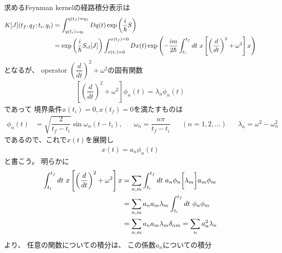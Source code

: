 求めるFeynman kernelの経路積分表示は
\begin{align}
    K[J]( t_f, q_f ; t_i, q_i )
    &=
    \int_{q(t_i) = q_i}^{q(t_f) = q_f}
        Dq(t)
    \exp\left(
        \dfrac{i}{\hbar} S
    \right)
\notag\\&=
    \exp\left(
        \dfrac{i}{\hbar} S_{cl} [J]
    \right)
    \int_{x(t_i) = 0}^{x(t_f) = 0}
        Dx(t)
    \exp\left(
        -
        \dfrac{ i m }{2\hbar}
        \int_{t_i}^{t_f} dt\ 
        x
        \left[
            \left(
                \dfrac{d}{dt}
            \right)^2
            +
            \omega^2
        \right]
        x
    \right)
\end{align}
となるが、
operator $
    \left(
        \dfrac{d}{dt}
    \right)^2
+
    \omega^2
$の固有関数
\begin{align}
    \left[
        \left(
            \dfrac{d}{dt}
        \right)^2
        +
        \omega^2
    \right]
    \phi_n(t)
    =
    \lambda_n
    \phi_n(t)
\end{align}
であって
境界条件$x(t_i) = 0, x(t_f) = 0$を満たすものは
\begin{align}
    \phi_n(t)
    &=
    \sqrt{ 
        \dfrac{
            2
        }{
            t_f - t_i
        }
    }
    \sin \omega_n (t - t_i)
    ,
    &&
    \omega_n
    =
    \dfrac{n \pi}{t_f - t_i}
    &&
    (n = 1, 2, \dots)
    &&
    \lambda_n
    =
    \omega^2
    -
    \omega_n^2
\end{align}
であるので、これで$x(t)$を展開し
\begin{align}
    x(t)
    =
    a_n
    \phi_n(t)
\end{align}
と書こう。
明らかに
\begin{align}
    \int_{t_i}^{t_f} dt\ 
    x
    \left[
        \left(
            \dfrac{d}{dt}
        \right)^2
        +
        \omega^2
    \right]
    x
    &=
    \sum_{n,m}
    \int_{t_i}^{t_f} dt\ 
    a_n \phi_n
    \bigg[
        \lambda_m
    \bigg]
    a_m \phi_m
\notag\\&=
    \sum_{n,m}
        a_n a_m
        \lambda_m
    \int_{t_i}^{t_f} dt\ 
    \phi_n
    \phi_m
\notag\\&=
    \sum_{n,m}
        a_n a_m
        \lambda_m
    \delta_{nm}
    =
    \sum_{n}
    a_n^2
    \lambda_n
\end{align}
より、
任意の関数についての積分は、
この係数$a_n$についての積分

